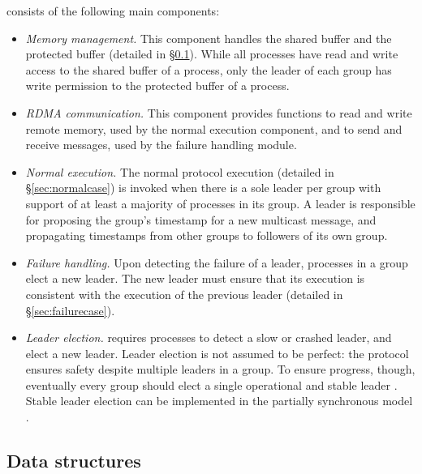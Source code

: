 \libname consists of the following main components:
\begin{itemize}
  \item \emph{Memory management.} This component handles the shared buffer and the protected buffer (detailed in \S\ref{sec:ds-structs}). While all processes have read and write access to the shared buffer of a process, only the leader of each group has write permission to the protected buffer of a process. 
  \item \emph{RDMA communication.} This component provides functions to read and write remote memory, used by the normal execution component, and to send and receive messages, used by the failure handling module.
  \item \emph{Normal execution.} The normal protocol execution (detailed in \S\ref{sec:normalcase}) is invoked when there is a sole leader per group with support of at least a majority of processes in its group. A leader is responsible for proposing the group's timestamp for a new multicast message, and propagating timestamps from other groups to followers of its own group.
  \item \emph{Failure handling.} Upon detecting the failure of a leader, processes in a group elect a new leader. The new leader must ensure that its execution is consistent with the execution of the previous leader (detailed in \S\ref{sec:failurecase}).
  \item \emph{Leader election.} \libname requires processes to detect a slow or crashed leader, and elect a new leader. Leader election is not assumed to be perfect: the protocol ensures safety despite multiple leaders in a group. To ensure progress, though, eventually every group should elect a single operational and stable leader \cite{Aguilera2019,L98}.
Stable leader election can be implemented in the partially synchronous model \cite{Aguilera2001}.
\end{itemize}

\subsection{Data structures}
\label{sec:ds-structs}

